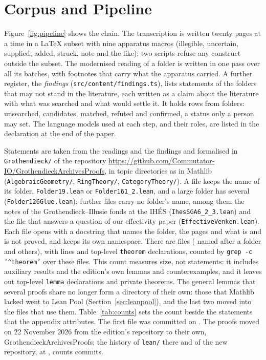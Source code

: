 \documentclass[runningheads,a4paper]{llncs}
\newcommand{\lean}[1]{\texttt{#1}}
\begin{document}
\section{Corpus and Pipeline}\label{sec:pipeline}



Figure~\ref{fig:pipeline} shows the chain. The transcription is written twenty pages at a time in a \LaTeX{} subset with nine apparatus macros (illegible, uncertain, supplied, added, struck, note and the like); two scripts refuse any construct outside the subset. The modernised reading of a folder is written in one pass over all its batches, with footnotes that carry what the apparatus carried. A further register, the \emph{findings} (\texttt{src/content/findings.ts}), lists statements of the folders that may not stand in the literature, each written as a claim about the literature with what was searched and what would settle it. It holds \cntFindings{} rows from \cntFindingFolders{} folders: \cntUnsearched{} unsearched, \cntCandidates{} candidates, \cntMatched{} matched, \cntRefuted{} refuted and \cntConfirmed{} confirmed, a status only a person may set. The language models used at each step, and their roles, are listed in the declaration at the end of the paper.

Statements are taken from the readings and the findings and formalised in \texttt{Grothendieck/} of the repository \url{https://github.com/Commutator-IO/GrothendieckArchivesProofs}, in topic directories as in Mathlib (\texttt{AlgebraicGeometry/}, \texttt{RingTheory/}, \texttt{CategoryTheory/}). A file keeps the name of its folder, \lean{Folder19.lean} or \lean{Folder161\_2.lean}, and a large folder has several (\lean{Folder126Glue.lean}); \cntOtherFiles{} further files carry no folder's name, among them the notes of the Grothendieck--Illusie fonds at the IHÉS (\lean{IhesSGA6\_2\_3.lean}) and the file that answers a question of our effectivity paper (\lean{EffectiveVenken.lean}). Each file opens with a docstring that names the folder, the pages and what is and is not proved, and keeps its own namespace. There are \cntFiles{} files (\cntFolderFiles{} named after a folder and \cntOtherFiles{} others), with \cntLines{} lines and \cntTheorems{} top-level \lean{theorem} declarations, counted by \texttt{grep -c '\textasciicircum theorem'} over these files. This count measures size, not statements: it includes auxiliary results and the edition's own lemmas and counterexamples, and it leaves out \cntLemmas{} top-level \lean{lemma} declarations and \cntPrivateTheorems{} private theorems. The general lemmas that several proofs share no longer form a directory of their own: those that Mathlib lacked went to Lean Pool (Section~\ref{sec:leanpool}), and the last two moved into the files that use them. Table~\ref{tab:counts} sets the count beside the statements that the appendix attributes. The first file was committed on \cntFirstCommit. The proofs moved on 22 November 2026 from the edition's repository to their own, GrothendieckArchivesProofs; the history of \texttt{lean/} there and of the new repository, at \cntProofsSnapshot, counts \cntCommits{} commits.
\end{document}
